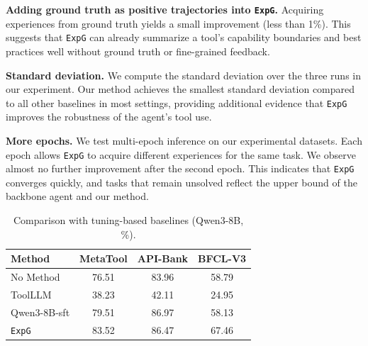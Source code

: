 \documentclass[11pt]{article}
\newcommand{\ours}{\texttt{ExpG}}
\begin{document}
\textbf{Adding ground truth as positive trajectories into {\ours}.}
Acquiring experiences from ground truth yields a small improvement (less than 1\%). This suggests that {\ours} can already summarize a tool's capability boundaries and best practices well without ground truth or fine-grained feedback.

\textbf{Standard deviation.}
We compute the standard deviation over the three runs in our experiment. Our method achieves the smallest standard deviation compared to all other baselines in most settings, providing additional evidence that {\ours} improves the robustness of the agent's tool use.

\textbf{More epochs.}
We test multi-epoch inference on our experimental datasets. Each epoch allows {\ours} to acquire different experiences for the same task. We observe almost no further improvement after the second epoch. This indicates that {\ours} converges quickly, and tasks that remain unsolved reflect the upper bound of the backbone agent and our method.

\begin{table}[t]
\caption{Comparison with tuning-based baselines (Qwen3-8B, \%).}
\vspace{-1mm}
\centering
\fontsize{8}{9}\selectfont
\setlength{\tabcolsep}{1.5pt}
\begin{tabular*}{\columnwidth}{@{\extracolsep{\fill}}lccc@{}}
\toprule
\textbf{Method} & \textbf{MetaTool} & \textbf{API-Bank} & \textbf{BFCL-V3} \\
\midrule
No Method & 76.51 & 83.96 & 58.79 \\
ToolLLM & 38.23 & 42.11 & 24.95 \\
Qwen3-8B-sft & 79.51 & 86.97 & 58.13 \\
{\ours} & 83.52 & 86.47 & 67.46 \\
\bottomrule
\end{tabular*}
\label{tab:tuning}
\vspace{-2mm}
\end{table}
\end{document}
